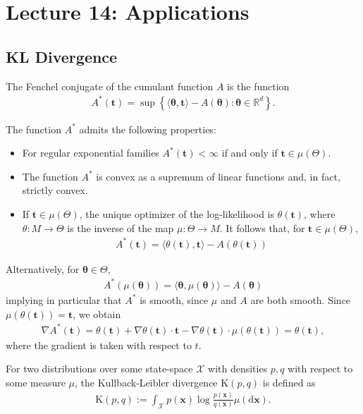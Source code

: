 \section{Lecture 14: Applications}
\subsection{KL Divergence}
The Fenchel conjugate of the cumulant function $A$ is the function
\begin{align*}
A^*(\mathbf{t})=\sup \left\{\langle\boldsymbol{\theta}, \mathbf{t}\rangle-A(\boldsymbol{\theta}): \boldsymbol{\theta} \in \mathbb{R}^d\right\} .
\end{align*}

\begin{prop}
    The function $A^*$ admits the following properties:
    \begin{itemize}
        \item For regular exponential families $A^*(\mathbf{t})<\infty$ if and only if $\mathbf{t} \in \mu(\Theta)$.
        \item  The function $A^*$ is convex as a supremum of linear functions and, in fact, strictly convex.
        \item  If $\mathbf{t} \in \mu(\Theta)$, the unique optimizer of the log-likelihood is $\theta(\mathbf{t})$, where $\theta: M \rightarrow \Theta$ is the inverse of the map $\mu: \Theta \rightarrow M$. It follows that, for $\mathbf{t} \in \mu(\Theta)$,
\begin{align*}
A^*(\mathbf{t})=\langle\theta(\mathbf{t}), \mathbf{t}\rangle-A(\theta(\mathbf{t}))
\end{align*}
    \end{itemize}
\end{prop}
\begin{remark}
    Alternatively, for $\boldsymbol{\theta} \in \Theta$,
\begin{align*}
A^*(\mu(\boldsymbol{\theta}))=\langle\boldsymbol{\theta}, \mu(\boldsymbol{\theta})\rangle-A(\boldsymbol{\theta})
\end{align*}
implying in particular that $A^*$ is smooth, since $\mu$ and $A$ are both smooth. Since $\mu(\theta(\mathbf{t}))=\mathbf{t}$, we obtain
\begin{align*}
\nabla A^*(\mathbf{t})=\theta(\mathbf{t})+\nabla \theta(\mathbf{t}) \cdot \mathbf{t}-\nabla \theta(\mathbf{t}) \cdot \mu(\theta(\mathbf{t}))=\theta(\mathbf{t}),
\end{align*}
where the gradient is taken with respect to $t$.
\end{remark} 
\begin{de}
    For two distributions over some state-space $\mathcal{X}$ with densities $p, q$ with respect to some measure $\mu$, the Kullback-Leibler divergence $\mathrm{K}(p, q)$ is defined as
\begin{align*}
\mathrm{K}(p, q):=\int_{\mathcal{X}} p(\mathbf{x}) \log \frac{p(\mathbf{x})}{q(\mathbf{x})} \mu(\mathrm{d} \mathbf{x}) .
\end{align*}
\end{de}

